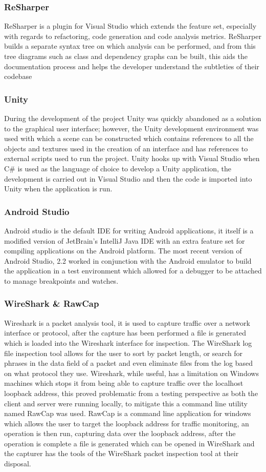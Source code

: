 \documentclass{article}
\begin{document}
\subsubsection{ReSharper}
ReSharper is a plugin for Visual Studio which extends the feature set, especially with regards to refactoring, code generation and code analysis metrics. ReSharper builds a separate syntax tree on which analysis can be performed, and from this tree diagrams such as class and dependency graphs can be built, this aids the documentation process and helps the developer understand the subtleties of their codebase
\subsubsection{Unity}
During the development of the project Unity was quickly abandoned as a solution to the graphical user interface; however, the Unity development environment was used with which a scene can be constructed which contains references to all the objects and textures used in the creation of an interface and has references to external scripts used to run the project. Unity hooks up with Visual Studio when C\# is used as the language of choice to develop a Unity application, the development is carried out in Visual Studio and then the code is imported into Unity when the application is run.
\subsubsection{Android Studio}
Android studio is the default IDE for writing Android applications, it itself is a modified version of JetBrain’s IntelliJ Java IDE with an extra feature set for compiling applications on the Android platform. The most recent version of Android Studio, 2.2 worked in conjunction with the Android emulator to build the application in a test environment which allowed for a debugger to be attached to manage breakpoints and watches.
\subsubsection{WireShark \& RawCap}
Wireshark is a packet analysis tool, it is used to capture traffic over a network interface or protocol, after the capture has been performed a file is generated which is loaded into the Wireshark interface for inspection. The WireShark log file inspection tool allows for the user to sort by packet length, or search for phrases in the data field of a packet and even eliminate files from the log based on what protocol they use. Wireshark, while useful, has a limitation on Windows machines which stops it from being able to capture traffic over the localhost loopback address, this proved problematic from a testing perspective as both the client and server were running locally, to mitigate this a command line utility named RawCap was used. RawCap is a command line application for windows which allows the user to target the loopback address for traffic monitoring, an operation is then run, capturing data over the loopback address, after the operation is complete a file is generated which can be opened in WireShark and the capturer has the tools of the WireShark packet inspection tool at their disposal.
\end{document}
